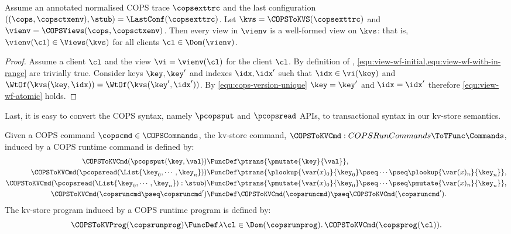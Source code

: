 \label{sec:cops-well-formed-encoded-view}
\begin{proposition}
\label{prop:cops-well-formed-view}
Assume an annotated normalised COPS trace \( \copsexttrc \) and the last configuration \( ((\cops, \copsctxenv),\stub) = \LastConf(\copsexttrc) \).
Let \( \kvs = \COPSToKVS(\copsexttrc) \) and \( \vienv = \COPSViews(\cops, \copsctxenv) \).
Then every view in \( \vienv \) is a well-formed view on \( \kvs \):
that is, \( \vienv(\cl) \in \Views(\kvs) \) for all clients \( \cl \in \Dom(\vienv) \).
\end{proposition}
\begin{proof}
Assume a client \( \cl \) and the view \( \vi = \vienv(\cl) \) for the client \( \cl \).
By definition of \COPSViews, \cref{equ:view-wf-initial,equ:view-wf-with-in-range} are trivially true.
Consider keys \( \key,\key' \) and indexes \( \idx,\idx' \) 
such that \( \idx \in \vi(\key) \) and \( \WtOf(\kvs(\key,\idx)) = \WtOf(\kvs(\key',\idx')) \).
By \cref{equ:cops-version-unique} \( \key = \key' \) and \( \idx = \idx' \)
therefore \cref{equ:view-wf-atomic} holds.
\end{proof}

Last, it is easy to convert the COPS syntax, namely \( \pcopsput\) and \( \pcopsread \) APIs,
to transactional syntax in our kv-store semantics.

\begin{definition}
Given a COPS command \( \copscmd \in \COPSCommands \),
the kv-store command, \( \COPSToKVCmd : COPSRunCommands \ToTFunc \Commands \),
induced by a COPS runtime command is defined by:
\begin{align*}
   \COPSToKVCmd(\pcopsput(\key,\val)) & \FuncDef \ptrans{ \pmutate{\key}{\val} } ,
\\ \COPSToKVCmd(\pcopsread(\List{\key_0, \cdots, \key_n })) 
        & \FuncDef \ptrans{ \plookup{\var(x)_0}{\key_0} \pseq \cdots \pseq \plookup{\var(x)_n}{\key_n}  } ,
\\ \COPSToKVCmd(\pcopsread(\List{\key_0, \cdots, \key_n }) : \stub) 
        & \FuncDef \ptrans{ \pmutate{\var(x)_0}{\key_0} \pseq \cdots \pseq \pmutate{\var(x)_n}{\key_n}  } ,
\\ \COPSToKVCmd(\copsruncmd \pseq \copsruncmd' ) 
        & \FuncDef \COPSToKVCmd(\copsruncmd) \pseq \COPSToKVCmd(\copsruncmd') .
\end{align*}                                                                 
The kv-store program induced by a COPS runtime program is defined by:
\[
    \COPSToKVProg(\copsrunprog) \FuncDef \lambda \cl \in \Dom(\copsrunprog) \ldotp \COPSToKVCmd(\copsprog(\cl)) .
\]
\end{definition}

